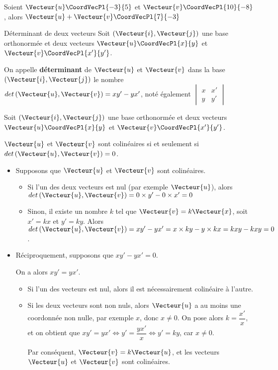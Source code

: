 \documentclass[a4paper]{article}
\begin{document}
\begin{example}{}{}
  Soient $\Vecteur{u}\CoordVecPl{-3}{5}$  et $\Vecteur{v}\CoordVecPl{10}{-8}$, alors $\Vecteur{u}+\Vecteur{v}\CoordVecPl{7}{-3}$
\end{example}


\begin{definition}{Déterminant de deux vecteurs}{}
Soit $\left(\Vecteur{i},\Vecteur{j}\right)$ une base orthonormée et deux vecteurs $\Vecteur{u}\CoordVecPl{x}{y}$ et $\Vecteur{v}\CoordVecPl{x'}{y'}$.

On appelle \textbf{déterminant} de $\Vecteur{u}$ et $\Vecteur{v}$ dans la base $\left(\Vecteur{i},\Vecteur{j}\right)$ le nombre $det\left(\Vecteur{u},\Vecteur{v}\right)=xy'-yx'$, noté également 
$\begin{vmatrix} 
  x & x' \\ 
  y & y' 
  \end{vmatrix} $
\end{definition}

\begin{propriete}{}{}
  Soit $\left(\Vecteur{i},\Vecteur{j}\right)$ une base orthonormée et deux vecteurs $\Vecteur{u}\CoordVecPl{x}{y}$ et $\Vecteur{v}\CoordVecPl{x'}{y'}$.

  $\Vecteur{u}$ et $\Vecteur{v}$ sont colinéaires si et seulement si $det\left(\Vecteur{u},\Vecteur{v}\right)=0$.
\end{propriete}

\begin{demonstrationp}{}{}
  \begin{itemize}
    \item Supposons que $\Vecteur{u}$ et $\Vecteur{v}$ sont colinéaires.
    \begin{itemize}
      \item Si l'un des deux vecteurs est nul (par exemple $\Vecteur{u}$), alors $det\left(\Vecteur{u},\Vecteur{v}\right)=0\times y'-0 \times x'=0$
      \item Sinon, il existe un nombre $k$ tel que $\Vecteur{v}=k\Vecteur{x}$, soit $x'=kx$ et $y'=ky$. Alors $det\left(\Vecteur{u},\Vecteur{v}\right)=xy'-yx'=x\times ky-y\times kx=kxy-kxy=0$.
    \end{itemize}

    \item Réciproquement, supposons que $xy'-yx'=0$.
    
    On a alors $xy'=yx'$. 
    \begin{itemize}
      \item Si l'un des vecteurs est nul, alors il est nécessairement colinéaire à l'autre.
      \item Si les deux vecteurs sont non nuls, alors $\Vecteur{u}$ a au moins une coordonnée non nulle, par exemple $x$, donc $x\neq0$.
        On pose alors $k=\dfrac{x'}{x}$, et on obtient que $xy'=yx' \iff y'=\dfrac{yx'}{x} \iff y'=ky$, car $x\neq 0$.

        Par conséquent, $\Vecteur{v}=k\Vecteur{u}$, et les vecteurs $\Vecteur{u}$ et $\Vecteur{v}$ sont colinéaires.
    \end{itemize}
  \end{itemize}

\end{demonstrationp}
\end{document}
